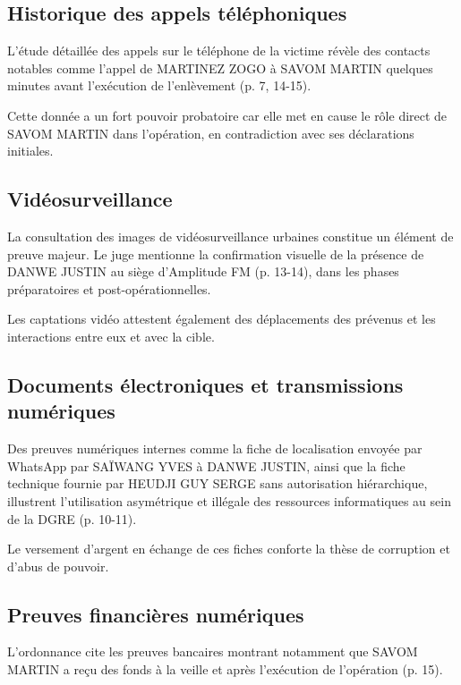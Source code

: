 \documentclass[12pt,a4paper]{article}
\begin{document}
	\subsection{Historique des appels téléphoniques}
	
	L'étude détaillée des appels sur le téléphone de la victime révèle des contacts notables comme l'appel de MARTINEZ ZOGO à SAVOM MARTIN quelques minutes avant l'exécution de l'enlèvement (p. 7, 14-15).
	
	Cette donnée a un fort pouvoir probatoire car elle met en cause le rôle direct de SAVOM MARTIN dans l'opération, en contradiction avec ses déclarations initiales.
	
	\subsection{Vidéosurveillance}
	
	La consultation des images de vidéosurveillance urbaines constitue un élément de preuve majeur. Le juge mentionne la confirmation visuelle de la présence de DANWE JUSTIN au siège d'Amplitude FM (p. 13-14), dans les phases préparatoires et post-opérationnelles.
	
	Les captations vidéo attestent également des déplacements des prévenus et les interactions entre eux et avec la cible.
	
	\subsection{Documents électroniques et transmissions numériques}
	
	Des preuves numériques internes comme la fiche de localisation envoyée par WhatsApp par SAÏWANG YVES à DANWE JUSTIN, ainsi que la fiche technique fournie par HEUDJI GUY SERGE sans autorisation hiérarchique, illustrent l'utilisation asymétrique et illégale des ressources informatiques au sein de la DGRE (p. 10-11).
	
	Le versement d'argent en échange de ces fiches conforte la thèse de corruption et d'abus de pouvoir.
	
	\subsection{Preuves financières numériques}
	
	L'ordonnance cite les preuves bancaires montrant notamment que SAVOM MARTIN a reçu des fonds à la veille et après l'exécution de l'opération (p. 15).
	
\end{document}
